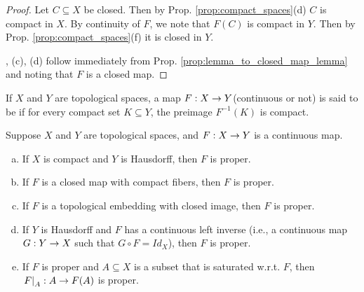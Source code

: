 \documentclass[11pt,a4paper]{article}
\begin{document}
\begin{proof}
 Let $C\subseteq X$ be closed. Then by Prop. \ref{prop:compact_spaces}(d) $C$ is compact in $X$. By continuity of $F$, we note that $F(C)$ is compact in $Y$. Then by Prop. \ref{prop:compact_spaces}(f) it is closed in $Y$. 

, {(c)}, {(d)} follow immediately from Prop. \ref{prop:lemma_to_closed_map_lemma} and noting that $F$ is a closed map.
\end{proof}

\begin{definition}
If $X$ and $Y$ are topological spaces, a map $F:X\rightarrow Y$(continuous or not) is said to be  if for every compact set $K\subseteq Y$, the preimage $F^{-1}(K)$ is compact.
\end{definition}

\begin{proposition}
Suppose $X$ and $Y$ are topological spaces, and $F:X\rightarrow Y$ is a continuous map.
\begin{enumerate}[(a)]
    \item If $X$ is compact and $Y$ is Hausdorff, then $F$ is proper.
    \item If $F$ is a closed map with compact fibers, then $F$ is proper.
    \item If $F$ is a topological embedding with closed image, then $F$ is proper.
    \item If $Y$ is Hausdorff and $F$ has a continuous left inverse (i.e., a continuous map $G:Y\rightarrow X$ such that $G\circ F = Id_X$), then $F$ is proper.
    \item If $F$ is proper and $A\subseteq X$ is a subset that is saturated w.r.t. $F$, then $\left.F\right|_{A}:A\rightarrow F(A)$ is proper.
\end{enumerate}
\end{proposition}
\end{document}
